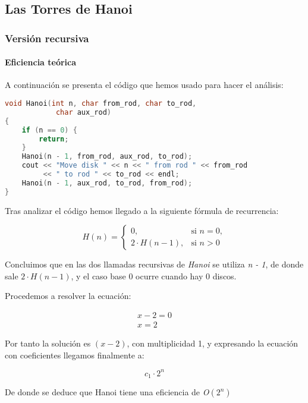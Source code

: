 \documentclass[a4paper,12pt]{article} %
\begin{document}
\subsection{Las Torres de Hanoi}

\subsubsection{Versión recursiva}
\paragraph{Eficiencia teórica}

A continuación se presenta el código que hemos usado para hacer el análisis:

\begin{lstlisting}[language=C, caption={Código de Hanoi}]
void Hanoi(int n, char from_rod, char to_rod,
            char aux_rod)
{
    if (n == 0) {
        return;
    }
    Hanoi(n - 1, from_rod, aux_rod, to_rod);
    cout << "Move disk " << n << " from rod " << from_rod
         << " to rod " << to_rod << endl;
    Hanoi(n - 1, aux_rod, to_rod, from_rod);
}
\end{lstlisting}

Tras analizar el código hemos llegado a la siguiente fórmula de recurrencia:

\[
	H(n)=
	\begin{cases}
		0,             & \text{si } n = 0, \\[6pt]
		2\cdot H(n-1), & \text{si } n > 0
	\end{cases}
\]

Concluimos que en las dos llamadas recursivas de \textit{Hanoi}
se utiliza \textit{n - 1}, de donde sale $2\cdot H(n-1)$, y el caso base
0 ocurre cuando hay 0 discos.

Procedemos a resolver la ecuación:

\begin{align*}
	x - 2 = 0 \\
	x = 2
\end{align*}

Por tanto la solución es $(x -2)$, con multiplicidad 1, y expresando la
ecuación con coeficientes llegamos finalmente a:

\begin{equation*}
	c_{1}\cdot 2^{n}
\end{equation*}

De donde se deduce que Hanoi tiene una eficiencia de \textit{O}$(2^{n})$
\end{document}
